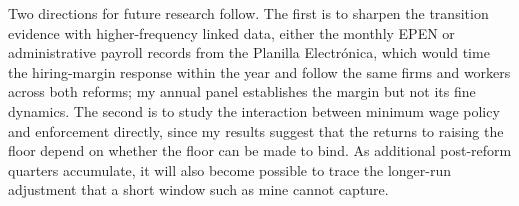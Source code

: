 Two directions for future research follow. The first is to sharpen the transition
evidence with higher-frequency linked data, either the monthly EPEN or administrative
payroll records from the Planilla Electrónica, which would time the hiring-margin
response within the year and follow the same firms and workers across both reforms;
my annual panel establishes the margin but not its fine dynamics. The second is to
study the interaction between minimum wage policy and enforcement directly, since my
results suggest that the returns to raising the floor depend on whether the floor can be
made to bind. As additional post-reform quarters accumulate, it will also become possible
to trace the longer-run adjustment that a short window such as mine cannot capture.
